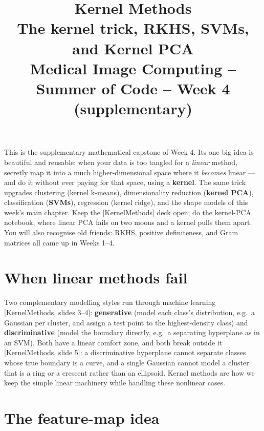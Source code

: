 \documentclass[11pt]{article}
\title{\textbf{Kernel Methods}\\[2pt]
\large The kernel trick, RKHS, SVMs, and Kernel PCA\\[6pt]
\normalsize Medical Image Computing -- Summer of Code -- Week 4 (supplementary)}
\author{}
\date{}
\newcommand{\deck}[1]{\textsf{\small[#1]}}
\begin{document}
\maketitle
\vspace{-2.2em}

\begin{keybox}
This is the supplementary mathematical capstone of Week 4. Its one big idea is
beautiful and reusable: when your data is too tangled for a \emph{linear} method,
secretly map it into a much higher-dimensional space where it \emph{becomes}
linear --- and do it without ever paying for that space, using a \textbf{kernel}.
The same trick upgrades clustering (kernel k-means), dimensionality reduction
(\textbf{kernel PCA}), classification (\textbf{SVMs}), regression (kernel ridge),
and the shape models of this week's main chapter. Keep the \deck{KernelMethods}
deck open; do the kernel-PCA notebook, where linear PCA fails on two moons and a
kernel pulls them apart. You will also recognise old friends: RKHS, positive
definiteness, and Gram matrices all came up in Weeks 1--4.
\end{keybox}

\tableofcontents
\bigskip

\section{When linear methods fail}

Two complementary modelling styles run through machine learning
\deck{KernelMethods, slides 3--4}: \textbf{generative} (model each class's
distribution, e.g.\ a Gaussian per cluster, and assign a test point to the
highest-density class) and \textbf{discriminative} (model the boundary directly,
e.g.\ a separating hyperplane as in an SVM). Both have a linear comfort zone, and
both break outside it \deck{KernelMethods, slide 5}: a discriminative hyperplane
cannot separate classes whose true boundary is a curve, and a single Gaussian
cannot model a cluster that is a ring or a crescent rather than an ellipsoid.
Kernel methods are how we keep the simple linear machinery while handling these
nonlinear cases.

\section{The feature-map idea}
\end{document}
